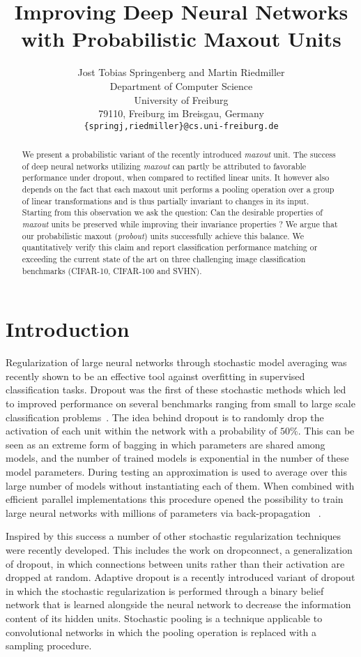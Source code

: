 \documentclass{article} \pdfoutput=1
\title{Improving Deep Neural Networks with
  Probabilistic Maxout Units}
\author{
 Jost Tobias Springenberg and Martin Riedmiller\\
 Department of Computer Science\\
 University of Freiburg \\
 79110, Freiburg im Breisgau, Germany \\
 \texttt{\{springj,riedmiller\}@cs.uni-freiburg.de} \\
 }
\begin{document}
\maketitle

\begin{abstract}
  We present a probabilistic variant of the recently introduced
  \emph{maxout} unit. The success of deep neural networks utilizing
  \emph{maxout} can partly be attributed to favorable performance
  under dropout, when compared to rectified linear units. It however
  also depends on the fact that each maxout unit performs a pooling
  operation over a group of linear transformations and is thus
  partially invariant to changes in its input. Starting from this
  observation we ask the question: Can the desirable properties of
  \emph{maxout} units be preserved while improving their invariance
  properties ? We argue that our probabilistic maxout (\emph{probout})
  units successfully achieve this balance. We quantitatively verify
  this claim and report classification performance matching or
  exceeding the current state of the art on three challenging image
  classification benchmarks (CIFAR-10, CIFAR-100 and SVHN).
\end{abstract}

\section{Introduction}
Regularization of large neural networks through stochastic model
averaging was recently shown to be an effective tool against
overfitting in supervised classification tasks. Dropout
\cite{Hinton2012} was the first of these stochastic methods which led
to improved performance on several benchmarks ranging from small to
large scale classification
problems~\cite{Krizhevsky2012,Hinton2012}. The idea behind
dropout is to randomly drop the activation of each unit within the
network with a probability of $50 \%$. This can be seen as an extreme
form of bagging in which parameters are shared among models, and the
number of trained models is exponential in the number of these model
parameters. During testing an approximation is used to average over
this large number of models without instantiating each of them.  When
combined with efficient parallel implementations this procedure opened
the possibility to train large neural networks with millions of
parameters via back-propagation \cite{Krizhevsky2012, Zeiler2013}~.

Inspired by this success a number of other stochastic regularization
techniques were recently developed. This includes the work on
dropconnect\cite{WanLi2013}, a generalization of dropout, in which
connections between units rather than their activation are dropped at
random. Adaptive dropout \cite{Frey2013} is a recently introduced
variant of dropout in which the stochastic regularization is performed
through a binary belief network that is learned alongside the neural
network to decrease the information content of its hidden units.
Stochastic pooling \cite{ZeilerStochastic2013} is a technique
applicable to convolutional networks in which the pooling operation is
replaced with a sampling procedure.
\end{document}
